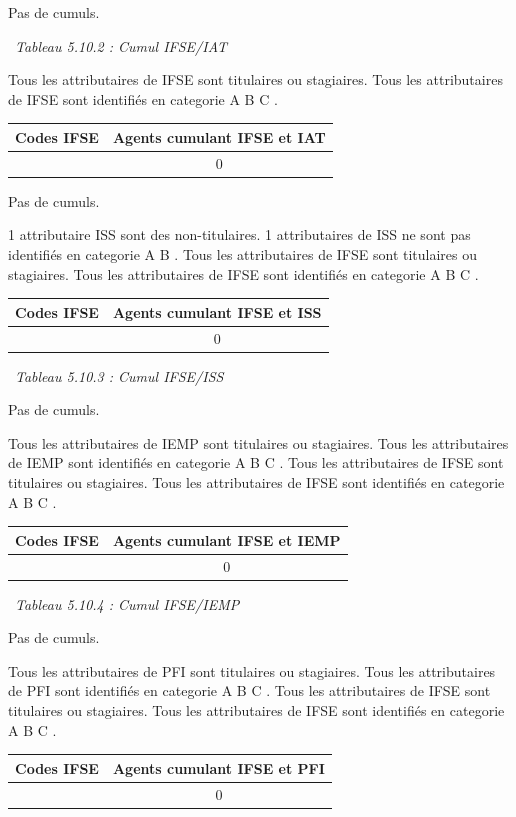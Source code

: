 Pas de cumuls.

~\emph{Tableau 5.10.2 : Cumul IFSE/IAT}

Tous les attributaires de IFSE sont titulaires ou stagiaires. Tous les
attributaires de IFSE sont identifiés en categorie A B C .

\begin{longtable}[]{@{}cc@{}}
\toprule
Codes IFSE & Agents cumulant IFSE et IAT\tabularnewline
\midrule
\endhead
& 0\tabularnewline
\bottomrule
\end{longtable}

Pas de cumuls.

1 attributaire ISS sont des non-titulaires. 1 attributaires de ISS ne
sont pas identifiés en categorie A B . Tous les attributaires de IFSE
sont titulaires ou stagiaires. Tous les attributaires de IFSE sont
identifiés en categorie A B C .

\begin{longtable}[]{@{}cc@{}}
\toprule
Codes IFSE & Agents cumulant IFSE et ISS\tabularnewline
\midrule
\endhead
& 0\tabularnewline
\bottomrule
\end{longtable}

~\emph{Tableau 5.10.3 : Cumul IFSE/ISS}

Pas de cumuls.

Tous les attributaires de IEMP sont titulaires ou stagiaires. Tous les
attributaires de IEMP sont identifiés en categorie A B C . Tous les
attributaires de IFSE sont titulaires ou stagiaires. Tous les
attributaires de IFSE sont identifiés en categorie A B C .

\begin{longtable}[]{@{}cc@{}}
\toprule
Codes IFSE & Agents cumulant IFSE et IEMP\tabularnewline
\midrule
\endhead
& 0\tabularnewline
\bottomrule
\end{longtable}

~\emph{Tableau 5.10.4 : Cumul IFSE/IEMP}

Pas de cumuls.

Tous les attributaires de PFI sont titulaires ou stagiaires. Tous les
attributaires de PFI sont identifiés en categorie A B C . Tous les
attributaires de IFSE sont titulaires ou stagiaires. Tous les
attributaires de IFSE sont identifiés en categorie A B C .

\begin{longtable}[]{@{}cc@{}}
\toprule
Codes IFSE & Agents cumulant IFSE et PFI\tabularnewline
\midrule
\endhead
& 0\tabularnewline
\bottomrule
\end{longtable}

